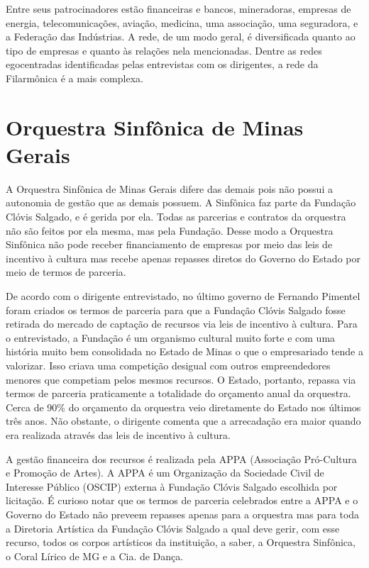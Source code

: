 \documentclass[a4paper, 12pt, openright, oneside, german, french, english, brazil]{abntex2}
\begin{document}
	Entre seus patrocinadores estão financeiras e bancos, mineradoras, empresas de energia, telecomunicações, aviação, medicina, uma associação, uma seguradora, e a Federação das Indústrias. A rede, de um modo geral, é diversificada quanto ao tipo de empresas e quanto às relações nela mencionadas. Dentre as redes egocentradas identificadas pelas entrevistas com os dirigentes, a rede da Filarmônica é a mais complexa.
	


	\chapter{Orquestra Sinfônica de Minas Gerais}

	A Orquestra Sinfônica de Minas Gerais difere das demais pois não possui a autonomia de gestão que as demais possuem. A Sinfônica faz parte da Fundação Clóvis Salgado, e é gerida por ela. Todas as parcerias e contratos da orquestra não são feitos por ela mesma, mas pela Fundação. Desse modo a Orquestra Sinfônica não pode receber financiamento de empresas por meio das leis de incentivo à cultura mas recebe apenas repasses diretos do Governo do Estado por meio de termos de parceria.
	
	De acordo com o dirigente entrevistado, no último governo de Fernando Pimentel foram criados os termos de parceria para que a Fundação Clóvis Salgado fosse retirada do mercado de captação de recursos via leis de incentivo à cultura. Para o entrevistado, a Fundação é um organismo cultural muito forte e com uma história muito bem consolidada no Estado de Minas o que o empresariado tende a valorizar. Isso criava uma competição desigual com outros empreendedores menores que competiam pelos mesmos recursos. O Estado, portanto, repassa via termos de parceria praticamente a totalidade do orçamento anual da orquestra. Cerca de 90\% do orçamento da orquestra veio diretamente do Estado nos últimos três anos. Não obstante, o dirigente comenta que a arrecadação era maior quando era realizada através das leis de incentivo à cultura.
	
	A gestão financeira dos recursos é realizada pela APPA (Associação Pró-Cultura e Promoção de Artes). A APPA é um Organização da Sociedade Civil de Interesse Público (OSCIP) externa à Fundação Clóvis Salgado escolhida por licitação. É curioso notar que os termos de parceria celebrados entre a APPA e o Governo do Estado não preveem repasses apenas para a orquestra mas para toda a Diretoria Artística da Fundação Clóvis Salgado a qual deve gerir, com esse recurso, todos os corpos artísticos da instituição, a saber, a Orquestra Sinfônica, o Coral Lírico de MG e a Cia. de Dança.
	
\end{document}
